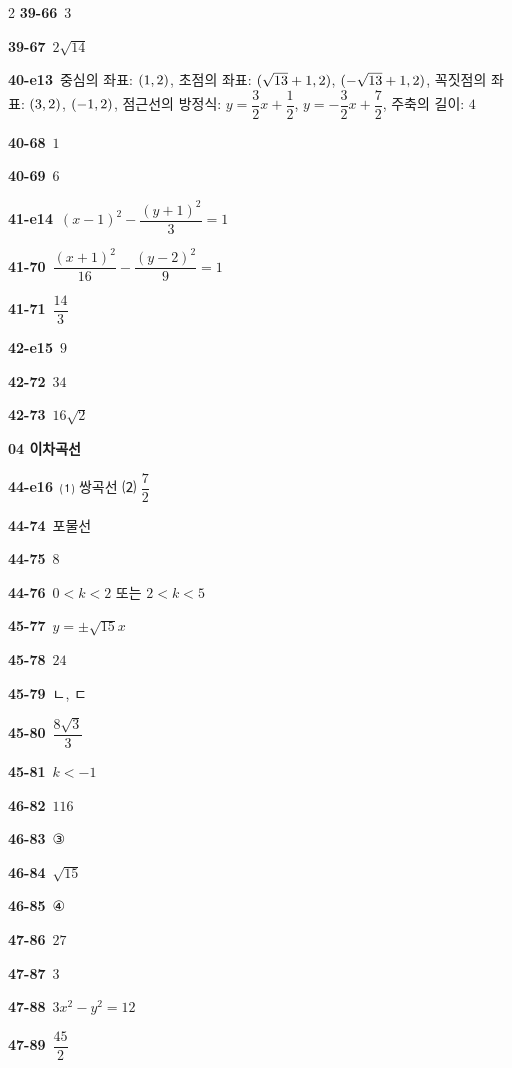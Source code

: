 \documentclass[10pt,a4paper]{article}
\begin{document}
\begin{multicols}{2}
\noindent\textbf{39-66}\ $3$\par
\noindent\textbf{39-67}\ $2\sqrt{14}$\par
\noindent\textbf{40-e13}\ 중심의 좌표: $(1{,}\mkern3mu\mathopen{}2)$, 초점의 좌표: $(\sqrt{13}+1{,}\mkern3mu\mathopen{}2)$, $(-\sqrt{13}+1{,}\mkern3mu\mathopen{}2)$, 꼭짓점의 좌표: $(3{,}\mkern3mu\mathopen{}2)$, $(-1{,}\mkern3mu\mathopen{}2)$, 점근선의 방정식: $y=\dfrac{3}{2}x+\dfrac{1}{2}$, $y=-\dfrac{3}{2}x+\dfrac{7}{2}$, 주축의 길이: $4$\par
\noindent\textbf{40-68}\ $1$\par
\noindent\textbf{40-69}\ $6$\par
\noindent\textbf{41-e14}\ $(x-1)^2-\dfrac{(y+1)^2}{3}=1$\par
\noindent\textbf{41-70}\ $\dfrac{(x+1)^2}{16}-\dfrac{(y-2)^2}{9}=1$\par
\noindent\textbf{41-71}\ $\dfrac{14}{3}$\par
\noindent\textbf{42-e15}\ $9$\par
\noindent\textbf{42-72}\ $34$\par
\noindent\textbf{42-73}\ $16\sqrt{2}$\par
\noindent\textbf{04 이차곡선}\par\smallskip
\noindent\textbf{44-e16}\ ⑴ 쌍곡선 ⑵ $\dfrac{7}{2}$\par
\noindent\textbf{44-74}\ 포물선\par
\noindent\textbf{44-75}\ $8$\par
\noindent\textbf{44-76}\ $0<k<2$ 또는 $2<k<5$\par
\noindent\textbf{45-77}\ $y=\pm\sqrt{15}x$\par
\noindent\textbf{45-78}\ $24$\par
\noindent\textbf{45-79}\ ㄴ, ㄷ\par
\noindent\textbf{45-80}\ $\dfrac{8\sqrt{3}}{3}$\par
\noindent\textbf{45-81}\ $k<-1$\par
\noindent\textbf{46-82}\ $116$\par
\noindent\textbf{46-83}\ ③\par
\noindent\textbf{46-84}\ $\sqrt{15}$\par
\noindent\textbf{46-85}\ ④\par
\noindent\textbf{47-86}\ $27$\par
\noindent\textbf{47-87}\ $3$\par
\noindent\textbf{47-88}\ $3x^2-y^2=12$\par
\noindent\textbf{47-89}\ $\dfrac{45}{2}$\par

\end{multicols}
\end{document}
